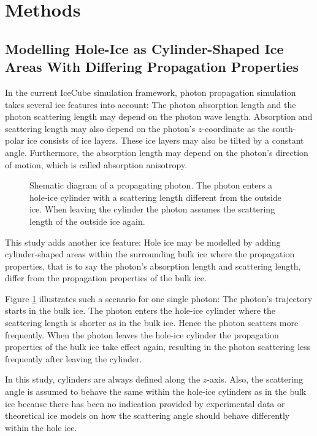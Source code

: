 
\section{Methods}

\subsection{Modelling Hole-Ice as Cylinder-Shaped Ice Areas With Differing Propagation Properties}

In the current IceCube simulation framework, photon propagation simulation takes several ice features into account: The photon absorption length and the photon scattering length may depend on the photon wave length. Absorption and scattering length may also depend on the photon's $z$-coordinate as the south-polar ice consists of ice layers. These ice layers may also be tilted by a constant angle. Furthermore, the absorption length may depend on the photon's direction of motion, which is called absorption anisotropy.

\begin{figure}[htb]
  \label{fig:aiw2Thah}
  \caption{Shematic diagram of a propagating photon. The photon enters a hole-ice cylinder with a scattering length different from the outside ice. When leaving the cylinder the photon assumes the scattering length of the outside ice again.}
\end{figure}

This study adds another ice feature: Hole ice may be modelled by adding cylinder-shaped areas within the surrounding bulk ice where the propagation properties, that is to say the photon's absorption length and scattering length, differ from the propagation properties of the bulk ice.

Figure \ref{fig:aiw2Thah} illustrates such a scenario for one single photon: The photon's trajectory starts in the bulk ice. The photon enters the hole-ice cylinder where the scattering length is shorter as in the bulk ice. Hence the photon scatters more frequently. When the photon leaves the hole-ice cylinder the propagation properties of the bulk ice take effect again, resulting in the photon scattering less frequently after leaving the cylinder.

In this study, cylinders are always defined along the $z$-axis. Also, the scattering angle is assumed to behave the same within the hole-ice cylinders as in the bulk ice because there has been no indication provided by experimental data or theoretical ice models on how the scattering angle should behave differently within the hole ice. 

